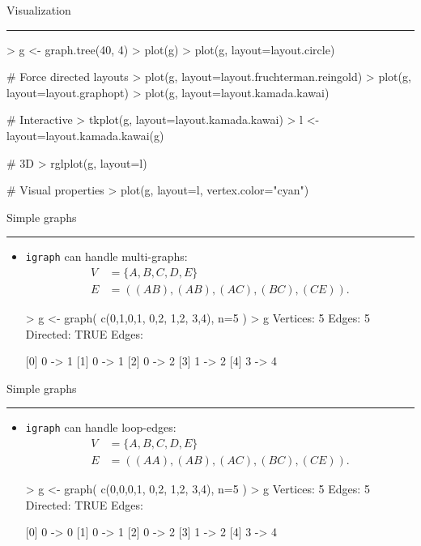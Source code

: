 \documentclass[landscape,fleqno]{foils}
\newcommand{\stitle}[1]{{\color{blue}\Large #1\par\vspace*{10pt}\hrule}}
\newcommand{\igraph}{\texttt{{igraph}}\xspace}
\newenvironment{narrow}[2]{%
  \begin{list}{}{%
      \setlength{\topsep}{0pt}%
      \setlength{\leftmargin}{#1}%
      \setlength{\rightmargin}{#2}%
      \setlength{\listparindent}{\parindent}%
      \setlength{\itemindent}{\parindent}%
      \setlength{\parsep}{\parskip}}%
    \item[]}{\end{list}}
\begin{document}
\newpage
\stitle{Visualization}
\begin{narrow}{0cm}{12cm}
\begin{Myverb}
  > g <- graph.tree(40, 4)
  > plot(g)
  > plot(g, layout=layout.circle)
\end{Myverb}
\vspace*{-2cm} \pause
\begin{Myverb}
  # Force directed layouts
  > plot(g, layout=layout.fruchterman.reingold)
  > plot(g, layout=layout.graphopt)
  > plot(g, layout=layout.kamada.kawai)
\end{Myverb}
\vspace*{-2cm} \pause
\begin{Myverb}
  # Interactive
  > tkplot(g, layout=layout.kamada.kawai)
  > l <- layout=layout.kamada.kawai(g)
\end{Myverb}
\vspace*{-2cm} \pause
\begin{Myverb}
  # 3D
  > rglplot(g, layout=l)
\end{Myverb}
\vspace*{-2cm} \pause
\begin{Myverb}
  # Visual properties
  > plot(g, layout=l, vertex.color="cyan")
\end{Myverb}
\end{narrow}

\newpage
\stitle{Simple graphs}
\begin{narrow}{0cm}{15cm}
\begin{itemize}
\item \igraph can handle multi-graphs:
  \begin{align} 
    V & =\{A,B,C,D,E\} \nonumber\\
    E & =( (AB),(AB),(AC),(BC),(CE) ). \nonumber
  \end{align}
  \begin{Myverb}
  > g <- graph( c(0,1,0,1, 0,2, 1,2, 3,4), n=5 )
  > g
  Vertices: 5 
  Edges: 5 
  Directed: TRUE 
  Edges:
          
  [0] 0 -> 1
  [1] 0 -> 1
  [2] 0 -> 2
  [3] 1 -> 2
  [4] 3 -> 4
  \end{Myverb}
\end{itemize}
\end{narrow}

\newpage
\stitle{Simple graphs}
\begin{narrow}{0cm}{15cm}
\begin{itemize}
\item \igraph can handle loop-edges:
  \begin{align} 
    V & =\{A,B,C,D,E\} \nonumber\\
    E & =( (AA),(AB),(AC),(BC),(CE) ). \nonumber
  \end{align}
  \begin{Myverb}
  > g <- graph( c(0,0,0,1, 0,2, 1,2, 3,4), n=5 )
  > g
  Vertices: 5 
  Edges: 5 
  Directed: TRUE 
  Edges:
          
  [0] 0 -> 0
  [1] 0 -> 1
  [2] 0 -> 2
  [3] 1 -> 2
  [4] 3 -> 4
  \end{Myverb}
\end{itemize}
\end{narrow}
\end{document}
